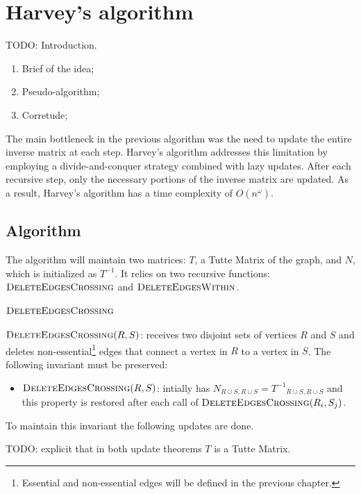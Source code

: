 \chapter{Harvey's algorithm}

TODO: Introduction.

\begin{enumerate}
    \item Brief of the idea;
    \item Pseudo-algorithm;
    \item Corretude;
\end{enumerate}

The main bottleneck in the previous algorithm was the need to update the entire inverse matrix at each step. 
Harvey's algorithm addresses this limitation by employing a divide-and-conquer strategy combined with lazy updates. 
After each recursive step, only the necessary portions of the inverse matrix are updated.
As a result, Harvey's algorithm has a time complexity of \(O(n^\omega)\).

\section{Algorithm}

The algorithm will maintain two matrices: \(T\), a Tutte Matrix of the graph, and \(N\), which is initialized as \(T^{-1}\).
It relies on two recursive functions: \(\textsc{DeleteEdgesCrossing}\) and \(\textsc{DeleteEdgesWithin}\). 

\subsubsection*{\(\textsc{DeleteEdgesCrossing}\)}

$\textsc{DeleteEdgesCrossing}(R, S)$: receives two disjoint sets of vertices \(R\) and \(S\) and 
deletes non-essential\footnote{Essential and non-essential edges will be defined in the previous chapter.} 
edges that connect a vertex in \(R\) to a vertex in \(S\).
The following invariant must be preserved:
\begin{itemize}
    \item \(\textsc{DeleteEdgesCrossing}(R, S)\): intially has \(N_{R \cup S, R \cup S} = {T^{-1}}_{R \cup S, R \cup S}\) and this property is restored after each call 
    of \(\textsc{DeleteEdgesCrossing}(R_i, S_j)\).
\end{itemize}
To maintain this invariant the following updates are done. 

TODO: explicit that in both update theorems \(T\) is a Tutte Matrix.

